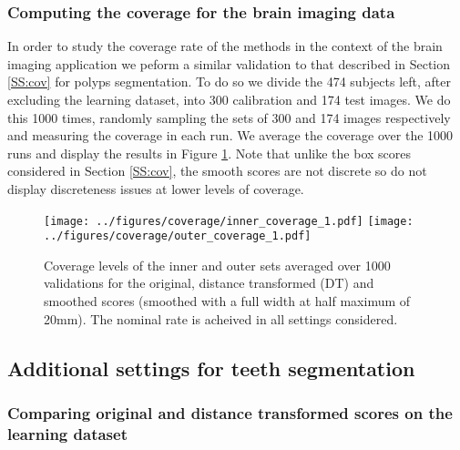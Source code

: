 \subsubsection{Computing the coverage for the brain imaging data}\label{SS:val2}
In order to study the coverage rate of the methods in the context of the brain imaging application we peform a similar validation to that described in Section \ref{SS:cov} for polyps segmentation. To do so we divide the 474 subjects left, after excluding the learning dataset, into 300 calibration and 174 test images. We do this 1000 times, randomly sampling the sets of 300 and 174 images respectively and measuring the coverage in each run. We average the coverage over the 1000 runs and display the results in Figure \ref{fig:coverage2}. Note that unlike the box scores considered in Section \ref{SS:cov}, the smooth scores are not discrete so do not display discreteness issues at lower levels of coverage. 
\begin{figure}[h!]
	\begin{center}
		\texttt{[image: ../figures/coverage/inner\_coverage\_1.pdf]}
		\texttt{[image: ../figures/coverage/outer\_coverage\_1.pdf]}
	\end{center}
	\caption{Coverage levels of the inner and outer sets averaged over 1000 validations for the original, distance transformed (DT) and smoothed scores (smoothed with a full width at half maximum of 20mm). The nominal rate is acheived in all settings considered.}\label{fig:coverage2}
\end{figure}

\newpage
\subsection{Additional settings for teeth segmentation}\label{A:teeth}

\subsubsection{Comparing original and distance transformed scores on the learning dataset}\label{teethlearnorig}

